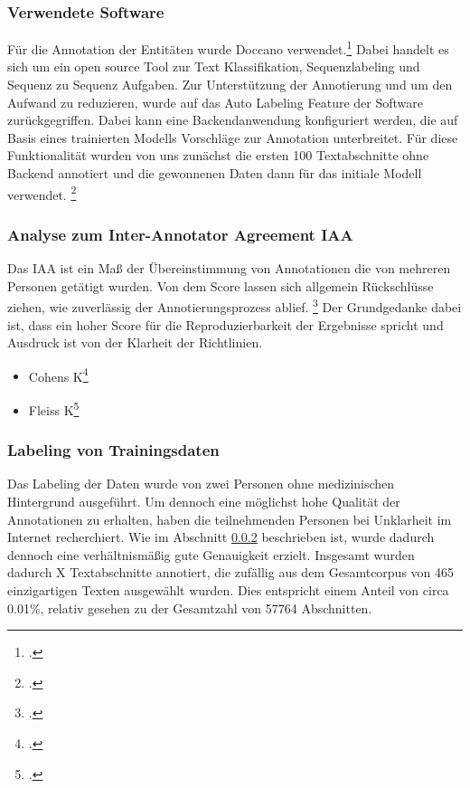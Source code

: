 \subsubsection{Verwendete Software}
Für die Annotation der Entitäten wurde Doccano verwendet.\footcite[vgl.][S.]{hirokinakayama2021} Dabei handelt es sich um ein open source Tool zur Text Klassifikation, Sequenzlabeling und Sequenz zu Sequenz Aufgaben.
Zur Unterstützung der Annotierung und um den Aufwand zu reduzieren, wurde auf das Auto Labeling Feature der Software zurückgegriffen. Dabei kann eine Backendanwendung konfiguriert werden, die auf Basis eines trainierten Modells Vorschläge zur Annotation unterbreitet.
Für diese Funktionalität wurden von uns zunächst die ersten 100 Textabschnitte ohne Backend annotiert und die gewonnenen Daten dann für das initiale Modell verwendet.
\footcite[vgl.][]{neves2014a}

\subsubsection{Analyse zum Inter-Annotator Agreement \ac{IAA}}\label{sec:IAA}
Das \acf*{IAA} ist ein Maß der Übereinstimmung von Annotationen die von mehreren Personen getätigt wurden. Von dem Score lassen sich allgemein Rückschlüsse ziehen, wie zuverlässig der Annotierungsprozess ablief. \footcite[vgl.][S.298]{ide2017} Der Grundgedanke dabei ist, dass ein hoher Score für die Reproduzierbarkeit der Ergebnisse spricht und Ausdruck ist von der Klarheit der Richtlinien.

\begin{itemize}
    \item Cohens K\footcite[vgl.][S.]{cohen1960}
    \item Fleiss K\footcite[vgl.][S.]{fleiss1971}
\end{itemize}

\subsubsection{Labeling von Trainingsdaten}
Das Labeling der Daten wurde von zwei Personen ohne medizinischen Hintergrund ausgeführt. Um dennoch eine möglichst hohe Qualität der Annotationen zu erhalten, haben die teilnehmenden Personen bei Unklarheit im Internet recherchiert. Wie im Abschnitt \ref{sec:IAA} beschrieben ist, wurde dadurch dennoch eine verhältnismäßig gute Genauigkeit erzielt.
Insgesamt wurden dadurch X Textabschnitte annotiert, die zufällig aus dem Gesamtcorpus von 465 einzigartigen Texten ausgewählt wurden. Dies entspricht einem Anteil von circa 0.01\%, relativ gesehen zu der Gesamtzahl von 57764 Abschnitten.

